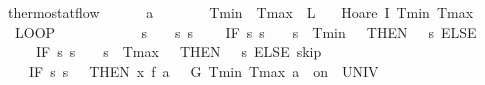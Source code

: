 \documentclass[envcountsame]{llncs}
\begin{document}
\begin{example}
\begin{isabellebody}
\isanewline
{}\isamarkupfalse%
\ thermostat{\isacharunderscore}flow{\isacharcolon}\ \isanewline
\ \ \ {\isachardoublequoteopen}{}\ {\isacharless}\ a{\isachardoublequoteclose}\ \ {\isachardoublequoteopen}{}\ {\isasymle}\ {\isasymtau}{\isachardoublequoteclose}\ \ {\isachardoublequoteopen}{}\ {\isacharless}\ Tmin{\isachardoublequoteclose}\ \ {\isachardoublequoteopen}Tmax\ {\isacharless}\ L{\isachardoublequoteclose}\isanewline
\ \ \ {\isachardoublequoteopen}Hoare\ {\isasymlceil}I\ Tmin\ Tmax{\isasymrceil}\isanewline
\ \ {\isacharparenleft}LOOP\ {\isacharparenleft}\isanewline
\ \ \ \ %
\isanewline
\ \ \ \ {\isacharparenleft}{}\ {\isacharcolon}{\isacharcolon}{\isacharequal}\ {\isacharparenleft}{\isasymlambda}s{\isachardot}\ {}{\isacharparenright}{\isacharparenright}{\isacharsemicolon}\ {\isacharparenleft}{}\ {\isacharcolon}{\isacharcolon}{\isacharequal}\ {\isacharparenleft}{\isasymlambda}s{\isachardot}\ s{\isachardollar}{}{\isacharparenright}{\isacharparenright}{\isacharsemicolon}\isanewline
\ \ \ \ {\isacharparenleft}IF\ {\isacharparenleft}{\isasymlambda}s{\isachardot}\ s{\isachardollar}{}\ {\isacharequal}\ {}\ {\isasymand}\ s{\isachardollar}{}\ {\isasymle}\ Tmin\ {\isacharplus}\ {}{\isacharparenright}\ THEN\ {\isacharparenleft}{}\ {\isacharcolon}{\isacharcolon}{\isacharequal}\ {\isacharparenleft}{\isasymlambda}s{\isachardot}{}{\isacharparenright}{\isacharparenright}\ ELSE\isanewline
\ \ \ \ \ IF\ {\isacharparenleft}{\isasymlambda}s{\isachardot}\ s{\isachardollar}{}\ {\isacharequal}\ {}\ {\isasymand}\ s{\isachardollar}{}\ {\isasymge}\ Tmax\ {\isacharminus}\ {}{\isacharparenright}\ THEN\ {\isacharparenleft}{}\ {\isacharcolon}{\isacharcolon}{\isacharequal}\ {\isacharparenleft}{\isasymlambda}s{\isachardot}{}{\isacharparenright}{\isacharparenright}\ ELSE\ skip{\isacharparenright}{\isacharsemicolon}\isanewline
\ \ \ \ %
\isanewline
\ \ \ \ {\isacharparenleft}IF\ {\isacharparenleft}{\isasymlambda}s{\isachardot}\ s{\isachardollar}{}\ {\isacharequal}\ {}{\isacharparenright}\ THEN\ {\isacharparenleft}x{\isasymacute}{\isacharequal}\ f\ a\ {}\ {\isacharampersand}\ G\ Tmin\ Tmax\ a\ {}\ on\ {\isacharbraceleft}{}{\isachardot}{\isachardot}{\isasymtau}{\isacharbraceright}\ UNIV\ {\isacharat}\ {}{\isacharparenright}\ \isanewline

\end{isabellebody}
\end{example}
\end{document}
